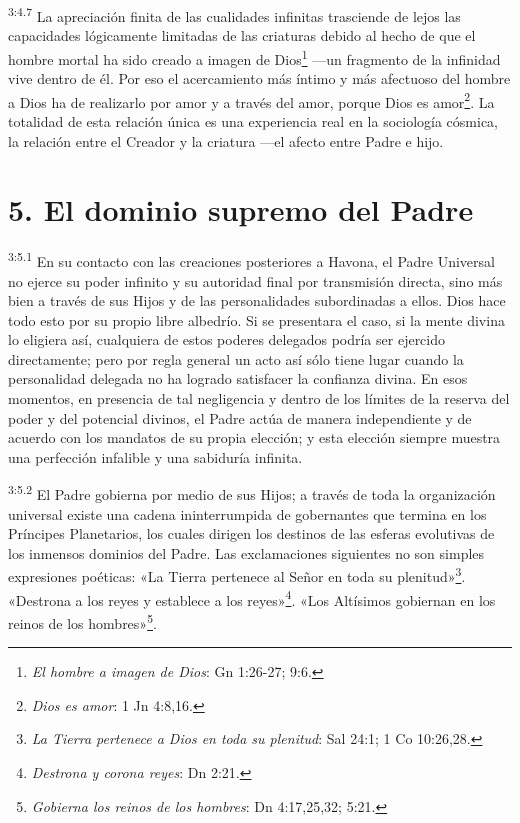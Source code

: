 \par
\textsuperscript{3:4.7} La apreciación finita de las cualidades infinitas trasciende de lejos las capacidades lógicamente limitadas de las criaturas debido al hecho de que el hombre mortal ha sido creado a imagen de Dios\footnote{\textit{El hombre a imagen de Dios}: Gn 1:26-27; 9:6.} ---un fragmento de la infinidad vive dentro de él. Por eso el acercamiento más íntimo y más afectuoso del hombre a Dios ha de realizarlo por amor y a través del amor, porque Dios es amor\footnote{\textit{Dios es amor}: 1 Jn 4:8,16.}. La totalidad de esta relación única es una experiencia real en la sociología cósmica, la relación entre el Creador y la criatura ---el afecto entre Padre e hijo.

\section*{5. El dominio supremo del Padre}
\par
\textsuperscript{3:5.1} En su contacto con las creaciones posteriores a Havona, el Padre Universal no ejerce su poder infinito y su autoridad final por transmisión directa, sino más bien a través de sus Hijos y de las personalidades subordinadas a ellos. Dios hace todo esto por su propio libre albedrío. Si se presentara el caso, si la mente divina lo eligiera así, cualquiera de estos poderes delegados podría ser ejercido directamente; pero por regla general un acto así sólo tiene lugar cuando la personalidad delegada no ha logrado satisfacer la confianza divina. En esos momentos, en presencia de tal negligencia y dentro de los límites de la reserva del poder y del potencial divinos, el Padre actúa de manera independiente y de acuerdo con los mandatos de su propia elección; y esta elección siempre muestra una perfección infalible y una sabiduría infinita.

\par
\textsuperscript{3:5.2} El Padre gobierna por medio de sus Hijos; a través de toda la organización universal existe una cadena ininterrumpida de gobernantes que termina en los Príncipes Planetarios, los cuales dirigen los destinos de las esferas evolutivas de los inmensos dominios del Padre. Las exclamaciones siguientes no son simples expresiones poéticas: «La Tierra pertenece al Señor en toda su plenitud»\footnote{\textit{La Tierra pertenece a Dios en toda su plenitud}: Sal 24:1; 1 Co 10:26,28.}. «Destrona a los reyes y establece a los reyes»\footnote{\textit{Destrona y corona reyes}: Dn 2:21.}. «Los Altísimos gobiernan en los reinos de los hombres»\footnote{\textit{Gobierna los reinos de los hombres}: Dn 4:17,25,32; 5:21.}.

